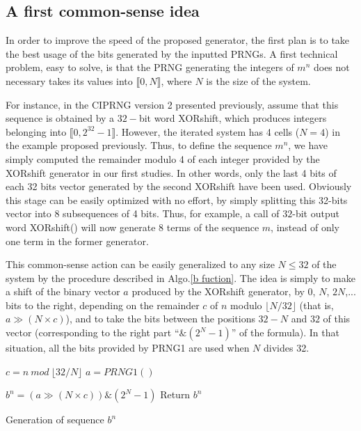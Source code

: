 \subsection{A first common-sense idea}

In order to improve the speed of the proposed generator, 
the first plan is to take the best usage of the bits generated by the inputted PRNGs.
A first technical problem, easy to solve, is that the PRNG generating the integers of $m^n$ does not necessary takes its values 
into $\llbracket 0, N \rrbracket$, where $N$ is the size of the system.

For instance, in the CIPRNG version 2 presented previously, assume that this sequence is obtained by a $32-$bit word
XORshift, which produces integers belonging into $\llbracket 0, 2^{32}-1 \rrbracket$.
However, the iterated system has 4 cells ($N=4$) in the example proposed previously. Thus, 
to define the sequence $m^n$, we have simply computed the remainder modulo 4 of each integer provided by the XORshift generator in our first studies.
In other words, only the last 4 bits of each 32 bits vector generated by the second XORshift have been used.
Obviously this stage can be easily optimized with no effort, by simply splitting this 32-bits vector into 8 subsequences of 4 bits.
Thus, for example, a call of $32$-bit output word XORshift() will now generate $8$ terms of the sequence $m$, instead of only one term in the former generator.

This common-sense action can be easily generalized to any size $N \leqslant 32$ of 
the system by the procedure described in Algo.\ref{b fuction}. The idea is simply 
to make a shift of the binary vector $a$ produced by the XORshift generator, by $0$, $N$, $2N$,... 
bits to the right, depending on the remainder $c$ of $n$ modulo $\lfloor N/32 \rfloor$ (that is, 
$a \gg (N \times c)$), and to take the bits between the positions $32-N$ and $32$ of this vector 
(corresponding to the right part ``$\& (2^N-1)$'' of the formula).
In that situation, all the bits provided by PRNG1 are used when $N$ divides 32.

\begin{algorithm}
\begin{algorithmic}[1]
\STATE $c=n~mod~\lfloor32/N\rfloor$
  \STATE $a = PRNG1()$
\ENDIF

  \STATE $b^n= (a\gg (N \times c))\& (2^N-1)$
\STATE Return {$b^n$}
\medskip
\end{algorithmic}
\caption{Generation of sequence $b^n$}
\label{b fuction}
\end{algorithm}

